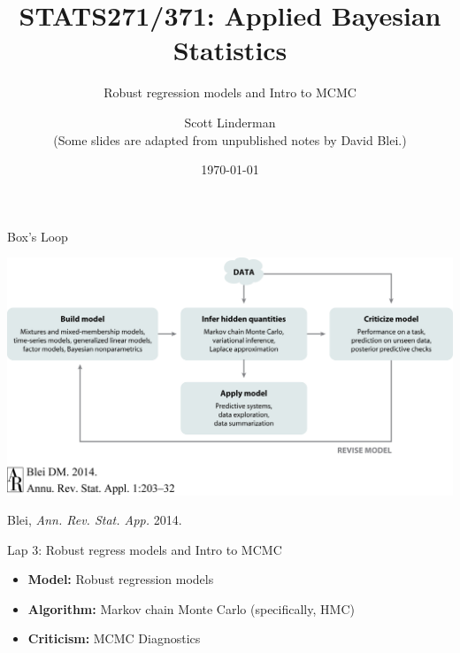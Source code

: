 \documentclass[aspectratio=169]{beamer}
\title{STATS271/371: Applied Bayesian Statistics}
\subtitle{Robust regression models and Intro to MCMC}
\author{Scott Linderman
\\
{\footnotesize (Some slides are adapted from unpublished notes by David Blei.)}}
\date{\today}
\begin{document}
\maketitle


\begin{frame}{Box's Loop}
\begin{center}
\includegraphics[width=.85\linewidth]{figures/lap1/boxsloop.jpeg}\\
\end{center} 
\begin{flushright}
{\footnotesize Blei, \textit{Ann. Rev. Stat. App.} 2014.}
\end{flushright}
\end{frame}

\begin{frame}{Lap 3: Robust regress models and Intro to MCMC}
\begin{itemize}
    \item \textbf{Model:} Robust regression models
    \item \textbf{Algorithm:} Markov chain Monte Carlo (specifically, HMC)
    \item \textbf{Criticism:} MCMC Diagnostics
\end{itemize}
\end{frame}
\end{document}

